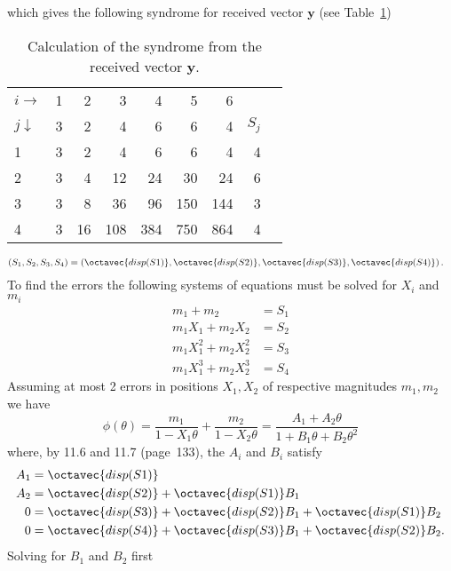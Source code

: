 which gives the following syndrome for received vector $\bm{y}$ (see Table~\ref{tab:2})
\begin{table}[!htp]\centering
\begin{tabular}{l|rrrrrr|rr}\toprule
$i\rightarrow$ &1 &2 &3 &4 &5 &6 & \\\cmidrule{1-7}
$j\downarrow$ &3 &2 &4 &6 &6 &4 & $S_j$\\\midrule
1 &3 &2 &4 &6 &6 &4 &4 \\
2 &3 &4 &12 &24 &30 &24 &6 \\
3 &3 &8 &36 &96 &150 &144 &3 \\
4 &3 &16 &108 &384 &750 &864 &4 \\
\bottomrule
\end{tabular}
\caption{Calculation of the syndrome from the received vector $\bm{y}$.}\label{tab:2}
\end{table}
\begin{align*}
(S_1,S_2,S_3,S_4) &=  \left( \octavec{disp(S1)}, \octavec{disp(S2)}, \octavec{disp(S3)},\octavec{disp(S4)} \right).
\end{align*}
To find the errors the following systems of equations must be solved for $X_i$ and $m_i$
\begin{align*}
	m_1 + m_2 &= S_1\\
	m_1X_1 + m_2X_2 &= S_2\\
	m_1X_1^2 + m_2X_2^2 &= S_3\\
	m_1X_1^3 + m_2X_2^3 &= S_4
\end{align*}
Assuming at most 2 errors in positions $X_1, X_2$ of respective magnitudes $m_1, m_2$ we have
\[
	\phi(\theta)=  \frac{m_1}{1-X_1\theta}+ \frac{m_2}{1-X_2\theta} = \frac{A_1 + A_2\theta}{1 + B_1\theta + B_2\theta^2}
\]
where, by 11.6 and 11.7 (\hill page~133), the $A_i$ and $B_i$ satisfy
\begin{align*}
	A_1 &= \octavec{disp(S1)}\\
	A_2 &= \octavec{disp(S2)} + \octavec{disp(S1)} B_1\\
	0   &= \octavec{disp(S3)} + \octavec{disp(S2)} B_1 + \octavec{disp(S1)}B_2\\
	0   &= \octavec{disp(S4)} + \octavec{disp(S3)} B_1 + \octavec{disp(S2)} B_2.
\end{align*}
Solving for $B_1$ and $B_2$ first
